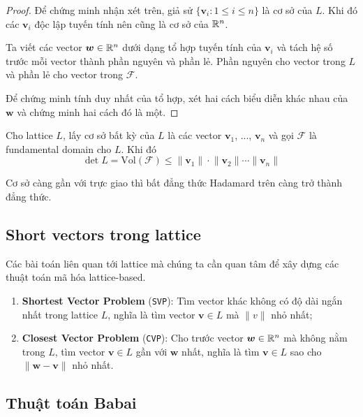 \begin{proof}
    Để chứng minh nhận xét trên, giả sử $\{ \bm{v}_i : 1 \leqslant i \leqslant n \}$ là cơ sở của $L$. Khi đó các $\bm{v}_i$ độc lập tuyến tính nên cũng là cơ sở của $\mathbb{R}^n$.

    Ta viết các vector $\bm{w} \in \mathbb{R}^n$ dưới dạng tổ hợp tuyến tính của $\bm{v}_i$ và tách hệ số trước mỗi vector thành phần nguyên và phần lẻ. Phần nguyên cho vector trong $L$ và phần lẻ cho vector trong $\mathcal{F}$.

    Để chứng minh tính duy nhất của tổ hợp, xét hai cách biểu diễn khác nhau của $\bm{w}$ và chứng minh hai cách đó là một.
\end{proof}

\begin{theorem}
    Cho lattice $L$, lấy cơ sở bất kỳ của $L$ là các vector $\bm{v}_1$, ..., $\bm{v}_n$ và gọi $\mathcal{F}$ là fundamental domain cho $L$. Khi đó
    \begin{equation}
        \det L = \text{Vol} (\mathcal{F}) \leqslant \lVert \bm{v}_1 \rVert \cdot \lVert \bm{v}_2 \rVert \cdots \lVert \bm{v}_n \rVert
    \end{equation}
\end{theorem}

Cơ sở càng gần với trực giao thì bất đẳng thức Hadamard trên càng trở thành đẳng thức.

\subsection*{Short vectors trong lattice}

Các bài toán liên quan tới lattice mà chúng ta cần quan tâm để xây dựng các thuật toán mã hóa lattice-based.

\begin{enumerate}
    \item \textbf{Shortest Vector Problem} (\texttt{SVP}): Tìm vector khác không có độ dài ngắn nhất trong lattice $L$, nghĩa là tìm vector $\bm{v} \in L$ mà $\lVert v \rVert$ nhỏ nhất;
    \item \textbf{Closest Vector Problem} (\texttt{CVP}): Cho trước vector $\bm{w} \in \mathbb{R}^n$ mà không nằm trong $L$, tìm vector $\bm{v} \in L$ gần với $\bm{w}$ nhất, nghĩa là tìm $\bm{v} \in L$ sao cho $\lVert \bm{w} - \bm{v} \rVert$ nhỏ nhất.
\end{enumerate}

\subsection*{Thuật toán Babai}

